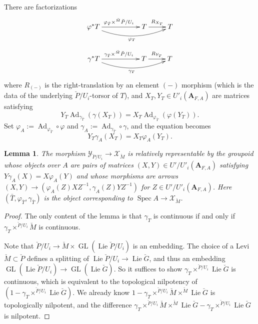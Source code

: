 \documentclass[11pt]{amsart}
\newtheorem{lem}{Lemma}
\numberwithin{thm}{section}
\numberwithin{lem}{section}
\numberwithin{cor}{section}
\numberwithin{prop}{section}
\numberwithin{exam}{section}
\numberwithin{dfn}{section}
\newcommand{\Ad}{\operatorname{Ad}}
\newcommand{\Lie}{\operatorname{Lie}}
\newcommand{\univ}{{\operatorname{univ}}}
\newcommand{\GL}{\operatorname{GL}}
\newcommand{\spec}{\operatorname{Spec}}
\newcommand{\cX}{\mathcal{X}}
\newcommand{\cY}{\mathcal{Y}}
\newcommand{\bM}{\breve{M}}
\newcommand{\bP}{\breve{P}}
\newcommand{\bG}{\breve{G}}
\newcommand{\A}{\mathbf{A}}
\begin{document}
There are factorizations
\[
\xymatrix{
\varphi^*T \ar[rr]^{\varphi_{\bar T}\times^{\bM}\bP/U_i} \ar@/_3ex/[rrr]_{\varphi_T} &&T \ar[r]^{R_{X_T}} &T
}
\]
\[
\xymatrix{
\gamma^*T \ar[rr]^{\gamma_{\bar T}\times^{\bM}\bP/U_i} \ar@/_3ex/[rrr]_{\gamma_T} &&T \ar[r]^{R_{Y_T}} &T
}
\]
where $R_{(-)}$
is the right-translation by an element $(-)$ morphism
(which is the data of the underlying $\bP/U_i$-torsor
of $T$),
and $X_T, Y_T\in U'_i(\A_{F,A})$
are matrices satisfying
\[
Y_T
\Ad_{\gamma_{\bar T}}(\gamma(X_T))
=
X_T
\Ad_{\varphi_{\bar T}}
(\varphi(Y_T)).
\]
Set
$\varphi_A:=
\Ad_{\varphi_{\bar T}}\circ \varphi$
and
$\gamma_A:=
\Ad_{\gamma_{\bar T}}\circ \gamma$,
and the equation becomes
\[
Y_T\gamma_A(X_T)
=X_T\varphi_A(Y_T).
\]


\begin{lem}
The morphism $\cY_{\bP/U_i}\to \cX_{\bM}$
is relatively representable by the groupoid
whose objects over $A$ are
pairs of matrices
$(X, Y)\in U'/U'_i(\A_{F,A})$
satisfying
$Y \gamma_A(X)
=
X \varphi_A(Y)$
and whose morphisms are arrows
$(X,Y)\to (\varphi_A(Z)XZ^{-1}, \gamma_A(Z)YZ^{-1})$
for $Z\in U'/U'_i(\A_{F,A})$.
Here $(\bar T, \varphi_{\bar T}, \gamma_{\bar T})$
is the object corresponding to
$\spec A\to \cX_{\bM}$.
\label{lem:Y-to-X}
\end{lem}

\begin{proof}
The only content of the lemma
is that $\gamma_T$
is continuous if and only if $\gamma_T \times^{\bP/U_i}\bM$
is continuous.

Note that
$\bP/U_i \to \bM \times \GL(\Lie \bP/U_i)$
is an embedding.
The choice of a Levi $\bM\subset\bP$
defines
a splitting of $\Lie \bP/U_i\to \Lie \bG$,
and thus an embedding
$\GL(\Lie \bP/U_i)\to\GL(\Lie \bG)$.
So it suffices to show
$\gamma_T\times^{\bP/U_i}\Lie \bG$
is continuous,
which is equivalent to the topological nilpotency
of $(1-\gamma_T\times^{\bP/U_i}\Lie \bG)$.
We already know
$1-\gamma_T\times^{\bP/U_i}\bM \times ^{\bM}\Lie \bG$
is topologically nilpotent,
and
the difference
$\gamma_T\times^{\bP/U_i}\bM \times ^{\bM}\Lie \bG
-
\gamma_T\times^{\bP/U_i}\Lie \bG
$ is nilpotent.
\end{proof}
\end{document}
